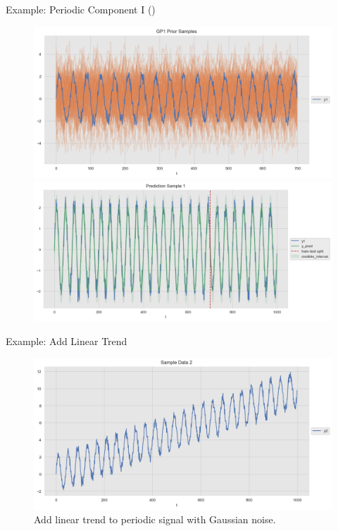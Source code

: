 \documentclass[10pt]{beamer}
\begin{document}
\begin{frame}{Example: Periodic Component I (\cite{gaussian_process_time_series_2019})}{\cite[Section 1.7. Gaussian Processes]{scikitlearn}}
\begin{center}
\begin{figure}
\includegraphics[scale=0.30]{images/gaussian_process_time_series_files/gaussian_process_time_series_22_0.png}
\includegraphics[scale=0.30]{images/gaussian_process_time_series_files/gaussian_process_time_series_28_0.png}
\end{figure}
\end{center}
\end{frame}

\begin{frame}{Example: Add Linear Trend }
\begin{center}
\begin{figure}
\includegraphics[scale=0.4]{images/gaussian_process_time_series_files/gaussian_process_time_series_37_0.png} 
\caption{Add linear trend to periodic signal with Gaussian noise.}
\end{figure}
\end{center}
\end{frame}
\end{document}
